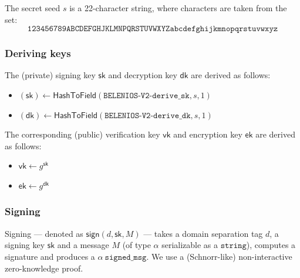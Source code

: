 \documentclass[a4paper]{article}
\newcommand{\dstprefix}{BELENIOS-V2}
\newcommand{\jstring}{\texttt{string}}
\begin{document}
The secret seed $s$ is a 22-character string, where characters are
taken from the set:
\[\texttt{123456789ABCDEFGHJKLMNPQRSTUVWXYZabcdefghijkmnopqrstuvwxyz}\]

\subsubsection{Deriving keys}

The (private) signing key $\textsf{sk}$ and decryption key
$\textsf{dk}$ are derived as follows:
\begin{itemize}
\item $(\textsf{sk})\leftarrow\textsf{HashToField}(\texttt{\dstprefix-derive\_sk},s,1)$
\item $(\textsf{dk})\leftarrow\textsf{HashToField}(\texttt{\dstprefix-derive\_dk},s,1)$
\end{itemize}
The corresponding (public) verification key $\textsf{vk}$ and
encryption key $\textsf{ek}$ are derived as follows:
\begin{itemize}
\item $\textsf{vk}\leftarrow g^{\textsf{sk}}$
\item $\textsf{ek}\leftarrow g^{\textsf{dk}}$
\end{itemize}

\subsubsection{Signing}
\label{pki-signing}

Signing --- denoted as $\textsf{sign}(d,\textsf{sk},M)$ --- takes a
domain separation tag $d$, a signing key $\textsf{sk}$ and a
\textsf{message} $M$ (of type $\alpha$ serializable as a $\jstring$),
computes a \textsf{signature} and produces a
$\alpha\ \texttt{signed\_msg}$. We use a (Schnorr-like)
non-interactive zero-knowledge proof.
\end{document}

